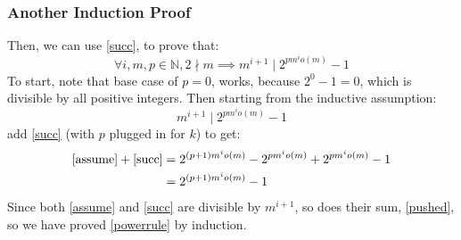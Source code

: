 \documentclass{article}
\begin{document}
  \subsubsection{Another Induction Proof}
  Then, we can use \eqref{succ}, to prove that:
  \begin{equation}\label{powerrule}
    \forall i, m ,p \in \mathbb{N}, 2 \nmid m \implies m^{i+1} \mid 2^{pm^{i}o(m)} - 1
  \end{equation}
  To start, note that base case of $p=0$, works, because $2^0 - 1 = 0$, which is divisible by all positive integers. Then starting from the inductive assumption:
  \begin{equation}\label{assume}
    m^{i+1} \mid 2^{pm^io(m)} - 1 
  \end{equation}
  add \eqref{succ} (with $p$ plugged in for $k$) to get:
  \begin{align}
    \eqref{assume} + \eqref{succ} &= 2^{(p+1)m^io(m)} - 2^{pm^io(m)} +2^{pm^io(m)} - 1\\
    &= 2^{(p+1)m^io(m)} - 1 \label{pushed}
  \end{align}
  Since both \eqref{assume} and \eqref{succ} are divisible by $m^{i+1}$, so does their sum, \eqref{pushed}, so we have proved \eqref{powerrule} by induction.
\end{document}
